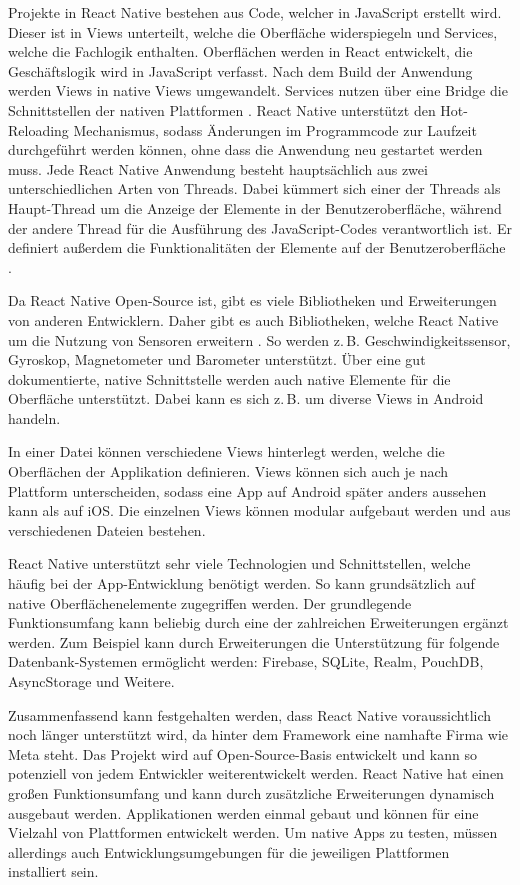 \documentclass[]{lni}
\begin{document}
Projekte in React Native bestehen aus Code, welcher in JavaScript erstellt wird. Dieser ist in Views unterteilt, welche die Oberfläche widerspiegeln und Services, welche die Fachlogik enthalten. Oberflächen werden in React entwickelt, die Geschäftslogik wird in JavaScript verfasst. Nach dem Build der Anwendung werden Views in native Views umgewandelt. Services nutzen über eine Bridge die Schnittstellen der nativen Plattformen \cite{Krypczyk.2021}. React Native unterstützt den Hot-Reloading Mechanismus, sodass Änderungen im Programmcode zur Laufzeit durchgeführt werden können, ohne dass die Anwendung neu gestartet werden muss. Jede React Native Anwendung besteht hauptsächlich aus zwei unterschiedlichen Arten von Threads. Dabei kümmert sich einer der Threads als Haupt-Thread um die Anzeige der Elemente in der Benutzeroberfläche, während der andere Thread für die Ausführung des JavaScript-Codes verantwortlich ist. Er definiert außerdem die Funktionalitäten der Elemente auf der Benutzeroberfläche \cite{Niemeier.04.11.2022}.

Da React Native Open-Source ist, gibt es viele Bibliotheken und Erweiterungen von anderen Entwicklern. Daher gibt es auch Bibliotheken, welche React Native um die Nutzung von Sensoren erweitern \cite{Schmidt.14.05.2018}. So werden z.\,B. Geschwindigkeitssensor, Gyroskop, Magnetometer und Barometer unterstützt. Über eine gut dokumentierte, native Schnittstelle werden auch native Elemente für die Oberfläche unterstützt. Dabei kann es sich z.\,B. um diverse Views in Android handeln.

In einer Datei können verschiedene Views hinterlegt werden, welche die Oberflächen der Applikation definieren. Views können sich auch je nach Plattform unterscheiden, sodass eine App auf Android später anders aussehen kann als auf iOS. Die einzelnen Views können modular aufgebaut werden und aus verschiedenen Dateien bestehen.

React Native unterstützt sehr viele Technologien und Schnittstellen, welche häufig bei der App-Entwicklung benötigt werden. So kann grundsätzlich auf native Oberflächenelemente zugegriffen werden. Der grundlegende Funktionsumfang kann beliebig durch eine der zahlreichen Erweiterungen ergänzt werden. Zum Beispiel kann durch Erweiterungen die Unterstützung für folgende Datenbank-Systemen ermöglicht werden: Firebase, SQLite, Realm, PouchDB, AsyncStorage und Weitere.

Zusammenfassend kann festgehalten werden, dass React Native voraussichtlich noch länger unterstützt wird, da hinter dem Framework eine namhafte Firma wie Meta steht. Das Projekt wird auf Open-Source-Basis entwickelt und kann so potenziell von jedem Entwickler weiterentwickelt werden. React Native hat einen großen Funktionsumfang und kann durch zusätzliche Erweiterungen dynamisch ausgebaut werden. Applikationen werden einmal gebaut und können für eine Vielzahl von Plattformen entwickelt werden. Um native Apps zu testen, müssen allerdings auch Entwicklungsumgebungen für die jeweiligen Plattformen installiert sein.
\end{document}
